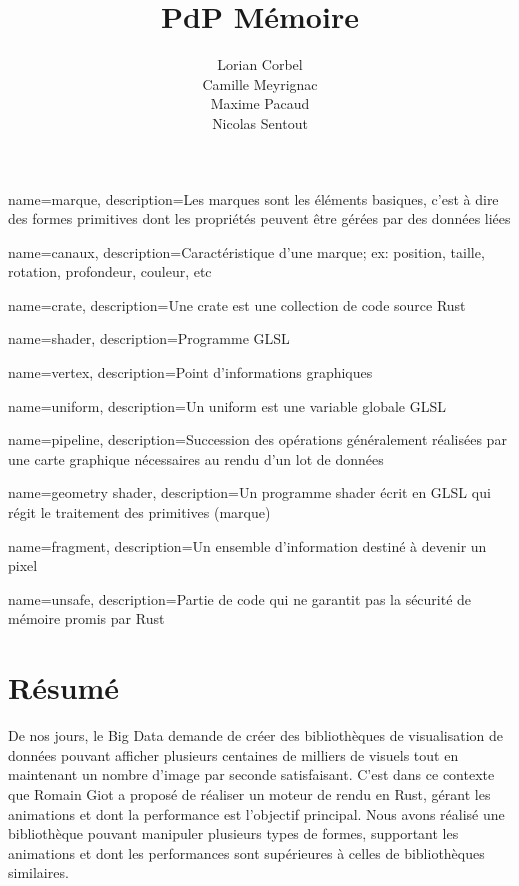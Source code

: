 \documentclass[12pt]{article}
\title{\gls{PdP} \smallbreak Mémoire }
\author{Lorian Corbel \\ Camille Meyrignac \\ Maxime Pacaud \\ Nicolas Sentout}
\begin{document}

{
    name=marque,
    description={Les marques sont les éléments basiques, c'est à dire des formes primitives dont les
    propriétés peuvent être gérées par des données liées}
}

{
    name=canaux,
    description={Caractéristique d'une marque; ex: position, taille, rotation, profondeur, couleur, etc}
}

{
    name=crate,
    description={Une crate est une collection de code source Rust}
}

{
    name=shader,
    description={Programme GLSL}
}

{
    name=vertex,
    description={Point d'informations graphiques}
}

{
    name=uniform,
    description={Un uniform est une variable globale GLSL}
}

{
    name=pipeline,
    description={Succession des opérations généralement réalisées par une carte graphique nécessaires au
    rendu d'un lot de données}
}

{
    name={geometry shader},
    description={Un programme shader écrit en GLSL qui régit le traitement des primitives (marque)}
}

{
    name={fragment},
    description={Un ensemble d'information destiné à devenir un pixel}
}

{
    name={unsafe},
    description={Partie de code qui ne garantit pas la sécurité de mémoire promis par Rust}
}

\maketitle
\tableofcontents
\newpage

\section{Résumé}

De nos jours, le Big Data demande de créer des bibliothèques de visualisation de données pouvant afficher plusieurs centaines de milliers de visuels tout en maintenant un nombre d'image par seconde satisfaisant.
C'est dans ce contexte que Romain Giot a proposé de réaliser un moteur de rendu en Rust, gérant les animations et dont la performance est l'objectif principal. Nous avons réalisé une bibliothèque pouvant manipuler plusieurs types de formes, supportant les animations et dont les performances sont supérieures à celles de bibliothèques similaires.
\end{document}
